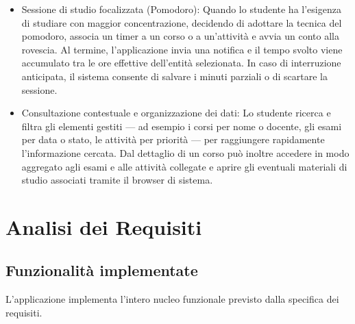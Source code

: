 \documentclass[a4paper, 12pt]{article}
\begin{document}
\begin{itemize}
    \item Sessione di studio focalizzata (Pomodoro): Quando lo studente ha l'esigenza di studiare con maggior concentrazione, decidendo di adottare la tecnica del pomodoro, associa un timer a un corso o a un'attività e avvia un conto alla rovescia. Al termine, l'applicazione invia una notifica e il tempo svolto viene accumulato tra le ore effettive dell'entità selezionata. In caso di interruzione anticipata, il sistema consente di salvare i minuti parziali o di scartare la sessione.
\item Consultazione contestuale e organizzazione dei dati: Lo studente ricerca e filtra gli elementi gestiti — ad esempio i corsi per nome o docente, gli esami per data o stato, le attività per priorità — per raggiungere rapidamente l'informazione cercata. Dal dettaglio di un corso può inoltre accedere in modo aggregato agli esami e alle attività collegate e aprire gli eventuali materiali di studio associati tramite il browser di sistema.
\end{itemize}
\section{Analisi dei Requisiti}
\subsection{Funzionalità implementate}
L'applicazione implementa l'intero nucleo funzionale previsto dalla specifica dei requisiti. 
\end{document}
